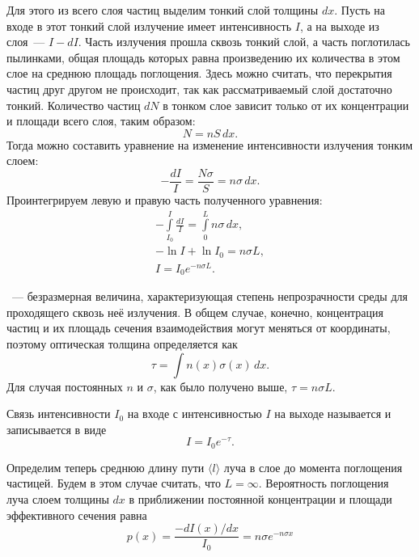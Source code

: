 Для этого из всего слоя частиц выделим тонкий слой толщины $dx$. Пусть на входе в этот тонкий слой излучение имеет интенсивность $I$, а на выходе из слоя~--- $I - dI$. Часть излучения прошла сквозь тонкий слой, а часть поглотилась пылинками, общая площадь которых равна произведению их количества в этом слое на среднюю площадь поглощения. Здесь можно считать, что перекрытия частиц друг другом не происходит, так как рассматриваемый слой достаточно тонкий. Количество частиц  $dN$ в тонком слое зависит только от их концентрации и площади всего слоя, таким образом:
\begin{equation*}
    N = n S \,d x.
\end{equation*}
Тогда можно составить уравнение на изменение интенсивности излучения тонким слоем:
\begin{equation*}
    -\frac{dI}{I} = \frac{N\sigma}{S} = n\sigma \,d x.
\end{equation*}
Проинтегрируем левую и правую часть полученного уравнения:
\begin{gather*}
    -\int\limits_{I_0}^{I} \frac{dI}{I} = \int\limits_{0}^{L} n \sigma \,d x,\\
    -\ln I + \ln I_0 = n\sigma L,\\[.5pc]
    I = I_0 e^{-n\sigma L}. \tag{\theequation}
\end{gather*}

~--- безразмерная величина, характеризующая степень непрозрачности среды для проходящего сквозь неё излучения. В общем случае, конечно, концентрация частиц и их площадь сечения взаимодействия могут меняться от координаты, поэтому оптическая толщина определяется как
\begin{equation}
    \tau = \int n(x) \sigma(x) \,d x.
\end{equation}
Для случая постоянных $n$ и $\sigma$, как было получено выше, $\tau = n \sigma L$.

Связь интенсивности $I_0$ на входе с интенсивностью $I$ на выходе называется  и записывается в виде
\begin{equation}
    I = I_0 e^{-\tau}.
\end{equation}

Определим теперь среднюю длину пути $\langle l \rangle$ луча в слое до момента поглощения частицей. Будем в этом случае считать, что $L = \infty$. Вероятность поглощения луча слоем толщины $dx$ в приближении постоянной концентрации и площади эффективного сечения равна
\begin{equation*}
    p(x) = \frac{-dI(x) / dx}{I_0} = n \sigma e^{-n\sigma x}
\end{equation*}

